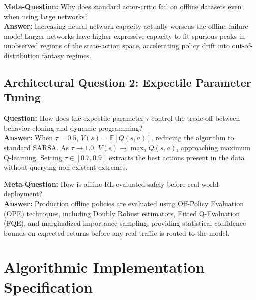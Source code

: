 \documentclass[11pt,a4paper]{article}
\theoremstyle{definition}
\begin{document}
\textbf{Meta-Question:} Why does standard actor-critic fail on offline datasets even when using large networks?\\
\textbf{Answer:} Increasing neural network capacity actually worsens the offline failure mode! Larger networks have higher expressive capacity to fit spurious peaks in unobserved regions of the state-action space, accelerating policy drift into out-of-distribution fantasy regimes.

\subsection{Architectural Question 2: Expectile Parameter Tuning}
\textbf{Question:} How does the expectile parameter $\tau$ control the trade-off between behavior cloning and dynamic programming?\\
\textbf{Answer:} When $\tau = 0.5$, $V(s) = \mathbb{E}[Q(s, a)]$, reducing the algorithm to standard SARSA. As $\tau \to 1.0$, $V(s) \to \max_{a} Q(s, a)$, approaching maximum Q-learning. Setting $\tau \in [0.7, 0.9]$ extracts the best actions present in the data without querying non-existent extremes.

\textbf{Meta-Question:} How is offline RL evaluated safely before real-world deployment?\\
\textbf{Answer:} Production offline policies are evaluated using Off-Policy Evaluation (OPE) techniques, including Doubly Robust estimators, Fitted Q-Evaluation (FQE), and marginalized importance sampling, providing statistical confidence bounds on expected returns before any real traffic is routed to the model.

\section{Algorithmic Implementation Specification}
\end{document}
